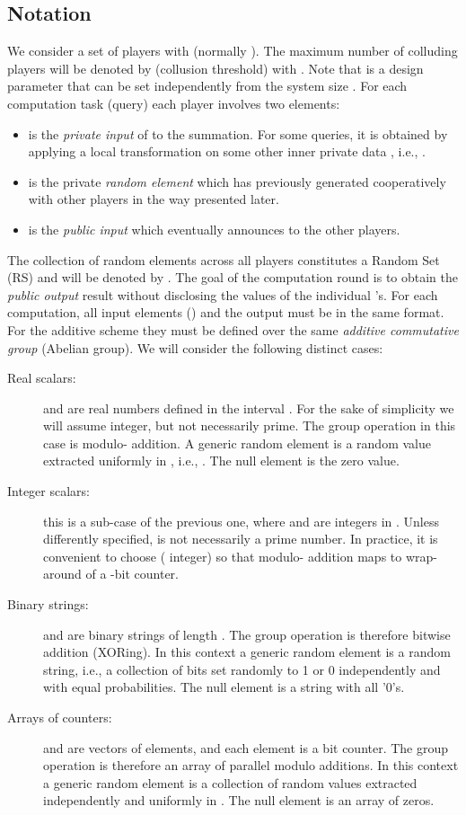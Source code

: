 \documentclass{sig-alternate}
\begin{document}
\subsection{Notation}\label{sec:notation}
We consider a set of  players  with  (normally ). 
The maximum number of colluding players will be denoted by  (collusion threshold) with .
Note that  is a design parameter that can be set independently from the system size .
For each computation task (query)  each player  involves two elements:
\begin{itemize}
\item  is the 
\emph{private input} of   to the summation. For some queries, it is obtained by applying a local transformation  on some other inner private data , i.e., .
\item  is the private {\em random element} which  has previously generated cooperatively with other players in the way presented later.
\item  is the {\em public input} which  eventually announces to the other players.
\end{itemize}
The collection of random elements across all players constitutes a  Random Set (RS) and will be denoted by .
The goal of the computation round is to obtain the {\em public output} result  
without disclosing the values of the individual 's. For each computation, all input elements () and the output  must be in the same format.
For the additive scheme they  must be defined over the same 
{\em additive commutative group} (Abelian group).
We will consider the following distinct cases:

\begin{description}
	\item [Real scalars:]  
	 and  are real numbers defined in the interval . For the sake of simplicity we will assume  integer, but not necessarily prime. 
The group operation in this case is modulo- addition.
A generic random element  is a random value extracted uniformly in , i.e., . The null element is the zero value.
	\item[Integer scalars:] 
this is a sub-case of the previous one, where  and  are integers in . Unless differently specified,  is  not necessarily a prime number. In practice, it is convenient to choose  ( integer) so that modulo- addition maps to wrap-around of a -bit counter. 
	\item[Binary strings:]  and  are binary strings of length . The group operation is therefore bitwise addition (XORing).
In this context a generic random element   is a random string, i.e., a collection of bits set randomly to 1 or 0 independently and with equal probabilities. The null element is  a string with all '0's.
	\item[Arrays of counters:]  and  are vectors of  elements, and each element is a  bit counter.
The group operation is therefore an array of    parallel modulo additions.
In this context a generic random element   is a collection of  random values  extracted independently and uniformly in . 
The null element is an array of zeros. 

\end{description}
\end{document}
